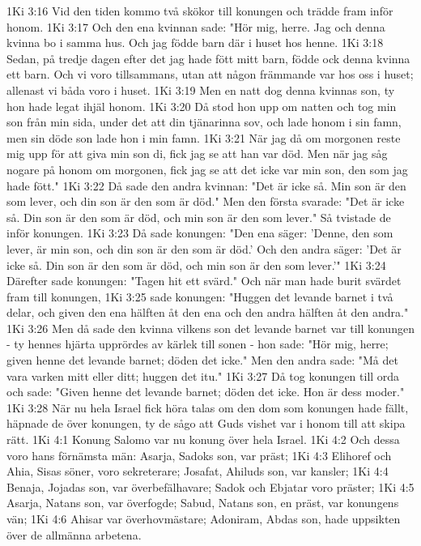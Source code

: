1Ki 3:16  Vid den tiden kommo två skökor till konungen och trädde fram inför honom.
1Ki 3:17  Och den ena kvinnan sade: "Hör mig, herre. Jag och denna kvinna bo i samma hus. Och jag födde barn där i huset hos henne.
1Ki 3:18  Sedan, på tredje dagen efter det jag hade fött mitt barn, födde ock denna kvinna ett barn. Och vi voro tillsammans, utan att någon främmande var hos oss i huset; allenast vi båda voro i huset.
1Ki 3:19  Men en natt dog denna kvinnas son, ty hon hade legat ihjäl honom.
1Ki 3:20  Då stod hon upp om natten och tog min son från min sida, under det att din tjänarinna sov, och lade honom i sin famn, men sin döde son lade hon i min famn.
1Ki 3:21  När jag då om morgonen reste mig upp för att giva min son di, fick jag se att han var död. Men när jag såg nogare på honom om morgonen, fick jag se att det icke var min son, den som jag hade fött."
1Ki 3:22  Då sade den andra kvinnan: "Det är icke så. Min son är den som lever, och din son är den som är död." Men den första svarade: "Det är icke så. Din son är den som är död, och min son är den som lever." Så tvistade de inför konungen.
1Ki 3:23  Då sade konungen: "Den ena säger: 'Denne, den som lever, är min son, och din son är den som är död.' Och den andra säger: 'Det är icke så. Din son är den som är död, och min son är den som lever.'"
1Ki 3:24  Därefter sade konungen: "Tagen hit ett svärd." Och när man hade burit svärdet fram till konungen,
1Ki 3:25  sade konungen: "Huggen det levande barnet i två delar, och given den ena hälften åt den ena och den andra hälften åt den andra."
1Ki 3:26  Men då sade den kvinna vilkens son det levande barnet var till konungen - ty hennes hjärta upprördes av kärlek till sonen - hon sade: "Hör mig, herre; given henne det levande barnet; döden det icke." Men den andra sade: "Må det vara varken mitt eller ditt; huggen det itu."
1Ki 3:27  Då tog konungen till orda och sade: "Given henne det levande barnet; döden det icke. Hon är dess moder."
1Ki 3:28  När nu hela Israel fick höra talas om den dom som konungen hade fällt, häpnade de över konungen, ty de sågo att Guds vishet var i honom till att skipa rätt.
1Ki 4:1  Konung Salomo var nu konung över hela Israel.
1Ki 4:2  Och dessa voro hans förnämsta män: Asarja, Sadoks son, var präst;
1Ki 4:3  Elihoref och Ahia, Sisas söner, voro sekreterare; Josafat, Ahiluds son, var kansler;
1Ki 4:4  Benaja, Jojadas son, var överbefälhavare; Sadok och Ebjatar voro präster;
1Ki 4:5  Asarja, Natans son, var överfogde; Sabud, Natans son, en präst, var konungens vän;
1Ki 4:6  Ahisar var överhovmästare; Adoniram, Abdas son, hade uppsikten över de allmänna arbetena.
